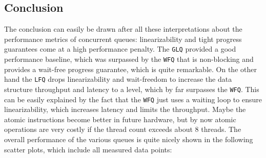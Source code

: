 \documentclass{article}
\newcommand{\GLQ}{\texttt{GLQ}}
\newcommand{\LFQ}{\texttt{LFQ}}
\newcommand{\WFQ}{\texttt{WFQ}}
\begin{document}
\subsection{Conclusion\label{sec:eval-conlusion}}
The conclusion can easily be drawn after all these interpretations about the performance metrics of concurrent queues: linearizability and tight progress guarantees come at a high performance penalty. The \GLQ{} provided a good performance baseline, which was surpassed by the \WFQ{} that is non-blocking and provides a wait-free progress guarantee, which is quite remarkable. On the other hand the \LFQ{} drops linearizability and wait-freedom to increase the data structure throughput and latency to a level, which by far surpasses the \WFQ{}. This can be easily explained by the fact that the \WFQ{} just uses a waiting loop to ensure linearizability, which increases latency and limits the throughput. Maybe the atomic instructions become better in future hardware, but by now atomic operations are very costly if the thread count exceeds about $8$ threads. The overall performance of the various queues is quite nicely shown in the following scatter plots, which include all measured data points:
\clearpage
\end{document}
